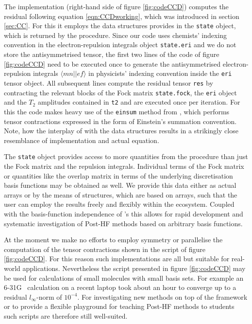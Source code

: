 The \python implementation (right-hand side
of figure \ref{fig:codeCCD})
computes the \CCD residual following equation \eqref{eqn:CCDworking},
which was introduced in section \ref{sec:CC}.
For this it employs the data structures \molsturm provides
in the \texttt{state} object, which is returned by the \SCF procedure.
Since our code uses chemists' indexing convention
in the electron-repulsion integrals object \texttt{state.eri}
and we do not store the antisymmetrised tensor,
the first two lines of the code of figure \ref{fig:codeCCD}
need to be executed once to generate
the antisymmetrised electron-repulsion integrals $\langle mn||ef \rangle$
in physicists' indexing convention
inside the \texttt{eri} tensor object.
All subsequent lines compute the residual tensor \texttt{res}
by contracting the relevant blocks of the Fock matrix \texttt{state.fock},
the \texttt{eri} object and the $T_2$ amplitudes contained in \texttt{t2}
and are executed once per \CCD iteration.
For this the code makes heavy use of the \texttt{einsum} method from \numpy,
which performs tensor contractions
expressed in the form of Einstein's summation convention.
Note, how the interplay of \numpy
with the data structures \molsturm results in a
strikingly close resemblance of implementation and actual equation.

The \texttt{state} object
provides access to more quantities from the \SCF procedure
than just the Fock matrix and the repulsion integrals.
Individual terms of the Fock matrix or
quantities like the overlap matrix in terms of the underlying
discretisation basis functions may be obtained as well.
We provide this data either as actual \numpy arrays
or by the means of structures,
which are based on \numpy arrays,
such that the user can employ the \SCF results freely and flexibly
within the \python ecosystem.
Coupled with the basis-function independence of \molsturm's
\SCF this allows for rapid development and systematic investigation
of Post-HF methods based on arbitrary basis functions.

At the moment we make no efforts to employ symmetry or parallelise
the computation of the tensor contractions
shown in the script of figure \ref{fig:codeCCD}.
For this reason such implementations are all but suitable for
real-world applications.
Nevertheless the script presented in figure \ref{fig:codeCCD}
may be used for \CCD calculations of small molecules with small basis sets.
For example an  6-31G~\cite{Hehre1972} calculation on a recent laptop took
about an hour to converge up to a residual $l_\infty$-norm of $10^{-4}$.
For investigating new methods on top of the \molsturm framework
or to provide a flexible playground for teaching Post-HF methods to students
such scripts are therefore still well-suited.

